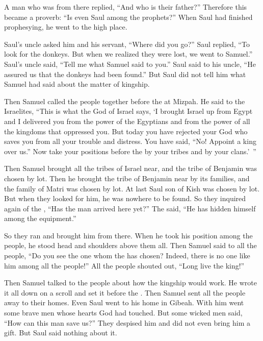{\par }{\PP {}A man
who was from there
replied,
“And who
is their father?” Therefore
this became
a proverb: “Is even
Saul
among the prophets?”
When Saul had finished
prophesying,
he went
to the high place.
\par }{\PP {}Saul’s
uncle
asked
him
and his servant,
“Where
did you go?” Saul replied,
“To look
for the donkeys.
But when
we
realized
they were lost,
we went
to
Samuel.”
Saul’s
uncle
said,
“Tell
me
what
Samuel
said to you.”
Saul
said
to
his uncle,
“He assured
us that
the donkeys
had been found.”
But Saul did not
tell
him what
Samuel
had
said
about the matter
of kingship.
\par }{\PP {}Then Samuel
called
the people
together before
the {}
at Mizpah.
He said
to
the Israelites,
“This is what
the {}
God
of Israel
says, ‘I
brought
Israel
up from Egypt
and I delivered
you from the
power
of the Egyptians
and from the power
of all
the kingdoms
that oppressed
you.
But
today
you
have rejected
your God
who
saves
you from all
your trouble
and distress.
You have said,
“No! Appoint
a king
over
us.” Now
take your positions
before
the {}
by your tribes and by your clans.’ ”
\par }{\PP {}Then
Samuel
brought all
the tribes
of Israel
near,
and the tribe
of Benjamin
was chosen by lot.
Then he brought
the tribe
of Benjamin
near by its families,
and the family
of Matri
was chosen by lot. At last Saul
son
of Kish
was chosen by
lot. But when they looked
for him, he was nowhere to be found.
So they inquired
again
of the {}, “Has the man
arrived
here
yet?” The
{}
said,
“He
has
hidden
himself among the equipment.”
\par }{\PP {}So they ran
and brought
him from there.
When
he took
his position
among
the people,
he stood head and shoulders
above
them all.
Then Samuel
said
to
all
the people,
“Do you see
the one whom
the {}
has chosen? Indeed,
there is no
one like
him among all
the people!” All
the people
shouted
out, “Long live
the king!”
\par }{\PP {}Then
Samuel
talked
to
the people
about how the kingship
would work. He wrote
it all down on a scroll
and set
it before
the {}. Then Samuel
sent
all
the people
away to their homes.
Even
Saul
went
to his home
in Gibeah.
With him
went
some brave
men whose
hearts
God
had
touched.
But some wicked
men said,
“How
can this
man save
us?” They despised
him and did not
even bring
him a gift.
But Saul said nothing about it.

}
